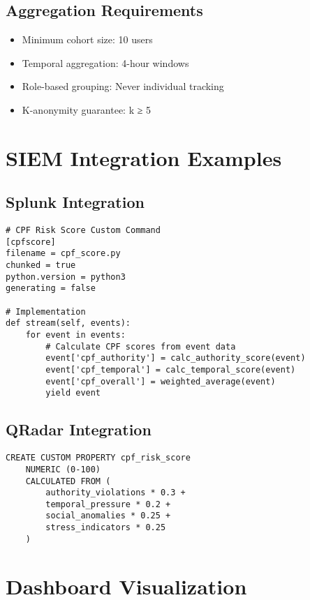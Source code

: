 \documentclass[11pt,a4paper]{article}
\begin{document}
\subsection{Aggregation Requirements}

\begin{itemize}
\item Minimum cohort size: 10 users
\item Temporal aggregation: 4-hour windows
\item Role-based grouping: Never individual tracking
\item K-anonymity guarantee: k ≥ 5
\end{itemize}

\section{SIEM Integration Examples}

\subsection{Splunk Integration}

\begin{lstlisting}
# CPF Risk Score Custom Command
[cpfscore]
filename = cpf_score.py
chunked = true
python.version = python3
generating = false

# Implementation
def stream(self, events):
    for event in events:
        # Calculate CPF scores from event data
        event['cpf_authority'] = calc_authority_score(event)
        event['cpf_temporal'] = calc_temporal_score(event)
        event['cpf_overall'] = weighted_average(event)
        yield event
\end{lstlisting}

\subsection{QRadar Integration}

\begin{verbatim}
CREATE CUSTOM PROPERTY cpf_risk_score 
    NUMERIC (0-100)
    CALCULATED FROM (
        authority_violations * 0.3 +
        temporal_pressure * 0.2 +
        social_anomalies * 0.25 +
        stress_indicators * 0.25
    )
\end{verbatim}

\section{Dashboard Visualization}
\end{document}
